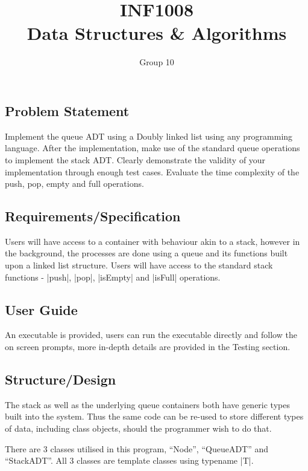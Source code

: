 \documentclass{report}
\title{\Huge{INF1008}\\Data Structures \& Algorithms}
\author{\huge{Group 10}}
\date{}
\begin{document}
\maketitle
\newpage%
\tableofcontents
\pagebreak
\chapter{}
\section{Problem Statement}
Implement the queue ADT using a Doubly linked list using any programming language. After the implementation, make use of the standard queue operations to implement the stack ADT. Clearly demonstrate the validity of your implementation through enough test cases. Evaluate the time complexity of the push, pop, empty and full operations.
\section{Requirements/Specification}
Users will have access to a container with behaviour akin to a stack, however in the background, the processes are done using a queue and its functions built upon a linked list structure. Users will have access to the standard stack functions - |push|, |pop|, |isEmpty| and |isFull| operations.
\section{User Guide}
An executable is provided, users can run the executable directly and follow the on screen prompts, more in-depth details are provided in the Testing section.
\section{Structure/Design}
The stack as well as the underlying queue containers both have generic types built into the system. Thus the same code can be re-used to store different types of data, including class objects, should the programmer wish to do that.

There are 3 classes utilised in this program, ``Node'', ``QueueADT'' and ``StackADT''. All 3 classes are template classes using typename |T|.
\end{document}
